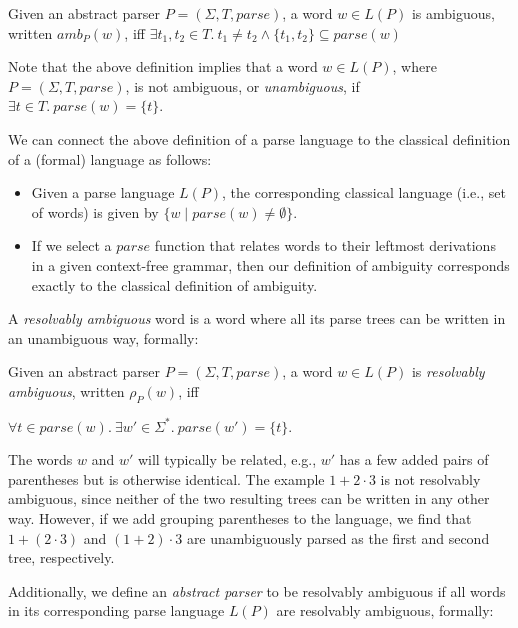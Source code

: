 \documentclass[runningheads]{llncs}
\newcommand{\T}{\Sigma} %
\newcommand{\parse}{\mathit{parse}} %
\newcommand{\amb}{\mathit{amb}}
\begin{document}
\begin{definition}
  Given an abstract parser $P = (\T, T, \parse)$, a word $w \in L(P)$
  is ambiguous, written $\amb_P(w)$, iff
%
  $\exists t_1, t_2 \in T.\ t_1 \neq t_2 \land \{t_1, t_2\} \subseteq \parse(w)$
\end{definition}

\noindent
Note that the above definition implies that a word $w \in L(P)$, where
$P = (\T, T, \parse)$, is not ambiguous, or \emph{unambiguous}, if
$\exists t \in T.\ \parse(w) = \{t\}$.

We can connect the above definition of a parse language to the
classical definition of a (formal) language as follows:

\begin{itemize}
\item Given a parse language $L(P)$, the corresponding classical language (i.e., set of words) is given by $\{ w \mid \parse(w) \neq \emptyset \}$.
\item If we select a $\parse$ function that relates words to their leftmost derivations in a given context-free grammar, then our definition of ambiguity corresponds exactly to the classical definition of ambiguity.
\end{itemize}

\noindent A \emph{resolvably ambiguous} word is a word where all its parse trees can be written in an unambiguous way, formally:

\begin{definition}\label{def:resolvable-word}
  Given an abstract parser $P = (\T, T, \parse)$, a word $w \in L(P)$ is \emph{resolvably ambiguous}, written $\rho_P(w)$, iff

  $\forall t \in \parse(w).\ \exists w' \in \T^{*}.\ \parse(w') = \{t\}$.
\end{definition}

The words $w$ and $w'$ will typically be related, e.g., $w'$ has a few added pairs of parentheses but is otherwise identical.
The example $1 + 2 \cdot 3$
is not resolvably ambiguous, since neither of the two resulting trees can be written in any other way. However, if we add grouping parentheses to the language, we find that $1 + (2 \cdot 3)$ and $(1 + 2) \cdot 3$ are unambiguously parsed as the first and second tree, respectively.

Additionally, we define an \emph{abstract parser} to be resolvably ambiguous if all words in its corresponding parse language $L(P)$ are resolvably ambiguous, formally:
\end{document}
